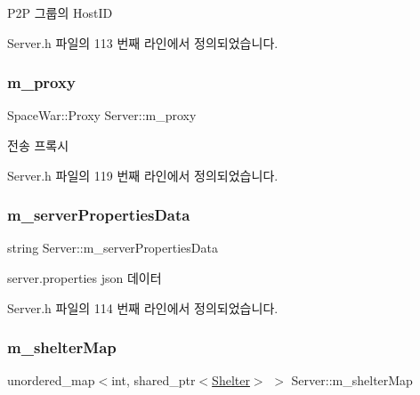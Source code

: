 P2P 그룹의 Host\+ID 



Server.\+h 파일의 113 번째 라인에서 정의되었습니다.

\mbox{\label{class_server_adbe7ca5dd78f70ef2771eb1724b397de}} 
\subsubsection{\texorpdfstring{m\+\_\+proxy}{m\_proxy}}
{\footnotesize\ttfamily Space\+War\+::\+Proxy Server\+::m\+\_\+proxy\hspace{0.3cm}{\ttfamily [private]}}



전송 프록시 



Server.\+h 파일의 119 번째 라인에서 정의되었습니다.

\mbox{\label{class_server_ae4a69c37027fd029b43099469ae00ad8}} 
\subsubsection{\texorpdfstring{m\+\_\+server\+Properties\+Data}{m\_serverPropertiesData}}
{\footnotesize\ttfamily string Server\+::m\+\_\+server\+Properties\+Data\hspace{0.3cm}{\ttfamily [private]}}



server.\+properties json 데이터 



Server.\+h 파일의 114 번째 라인에서 정의되었습니다.

\mbox{\label{class_server_a75eda393f27b20a83e6effb5405e902a}} 
\subsubsection{\texorpdfstring{m\+\_\+shelter\+Map}{m\_shelterMap}}
{\footnotesize\ttfamily unordered\+\_\+map$<$int, shared\+\_\+ptr$<$\hyperlink{class_shelter}{Shelter}$>$ $>$ Server\+::m\+\_\+shelter\+Map\hspace{0.3cm}{\ttfamily [private]}}



